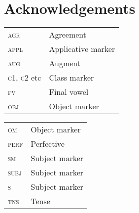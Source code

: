 \documentclass[output=paper
,newtxmath
,modfonts
,nonflat]{langsci/langscibook}
\begin{document}
\section*{Acknowledgements}
\begin{tabularx}{.45\textwidth}{lQ}
\textsc{agr} & Agreement\\
\textsc{appl} & Applicative marker\\
\textsc{aug} & Augment\\
\textsc{c1, c2} etc & Class marker\\
\textsc{fv} & Final vowel\\
\textsc{obj} & Object marker\\
\end{tabularx}
\begin{tabularx}{.45\textwidth}{lQ}
\textsc{om} & Object marker\\
\textsc{perf} & Perfective\\
\textsc{sm} & Subject marker\\
\textsc{subj} & Subject marker\\
\textsc{s} & Subject marker\\
\textsc{tns} & Tense\\
\end{tabularx}
\end{document}
